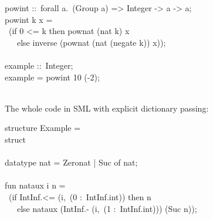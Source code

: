 \begin{isabellebody}
\begin{isamarkuptext}
\hspace*{0pt}pow{}int ::~forall a.~(Group a) => Integer -> a -> a;\\
\hspace*{0pt}pow{}int k x =\\
\hspace*{0pt} ~(if 0 <= k then pow{}nat (nat k) x\\
\hspace*{0pt} ~~~else inverse (pow{}nat (nat (negate k)) x));\\
\hspace*{0pt}\\
\hspace*{0pt}example ::~Integer;\\
\hspace*{0pt}example = pow{}int 10 (-2);\\
\hspace*{0pt}\\
\hspace*{0pt}{\char125}%
\end{isamarkuptext}%
\isamarkuptrue%
%
\endisatagquote
{\isafoldquote}%
%
\isadelimquote
%
\endisadelimquote
%
\begin{isamarkuptext}%
\noindent The whole code in SML with explicit dictionary passing:%
\end{isamarkuptext}%
\isamarkuptrue%
%
\isadelimquote
%
\endisadelimquote
%
\isatagquote
%
\begin{isamarkuptext}%
\isatypewriter%
\noindent%
\hspace*{0pt}structure Example = \\
\hspace*{0pt}struct\\
\hspace*{0pt}\\
\hspace*{0pt}datatype nat = Zero{}nat | Suc of nat;\\
\hspace*{0pt}\\
\hspace*{0pt}fun nat{}aux i n =\\
\hspace*{0pt} ~(if IntInf.<= (i,~(0 :~IntInf.int)) then n\\
\hspace*{0pt} ~~~else nat{}aux (IntInf.- (i,~(1 :~IntInf.int))) (Suc n));\\
\hspace*{0pt}\\

\end{isamarkuptext}
\end{isabellebody}

